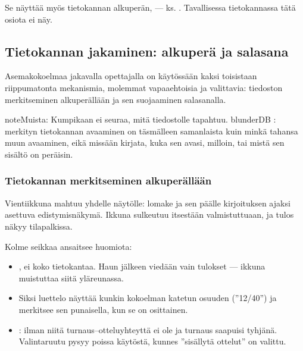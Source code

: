 \documentclass[letterpaper,10pt,finnish]{sphinxmanual}
\begin{document}
\sphinxAtStartPar
Se näyttää myös tietokannan alkuperän,  — ks. {\hyperref[\detokenize{manuel:diffusion-controlee}]{}}. Tavallisessa tietokannassa tätä osiota ei näy.


\subsection{Tietokannan jakaminen: alkuperä ja salasana}
\label{\detokenize{manuel:diffuser-une-base-origine-et-mot-de-passe}}\label{\detokenize{manuel:diffusion-controlee}}
\sphinxAtStartPar
Asemakokoelmaa jakavalla opettajalla on käytössään kaksi toisistaan riippumatonta mekanismia, molemmat vapaaehtoisia ja  valittavia: tiedoston merkitseminen alkuperällään ja sen suojaaminen salasanalla.

\begin{sphinxadmonition}{note}{Muista:}
\sphinxAtStartPar
Kumpikaan ei seuraa, mitä tiedostolle tapahtuu. blunderDB : merkityn tietokannan avaaminen on täsmälleen samanlaista kuin minkä tahansa muun avaaminen, eikä missään kirjata, kuka sen avasi, milloin, tai mistä sen sisältö on peräisin.
\end{sphinxadmonition}


\subsubsection{Tietokannan merkitseminen alkuperällään}
\label{\detokenize{manuel:marquer-une-base-de-son-origine}}
\sphinxAtStartPar
Vienti\sphinxhyphen{}ikkuna mahtuu yhdelle näytölle: lomake ja sen päälle kirjoituksen ajaksi asettuva edistymisnäkymä. Ikkuna sulkeutuu itsestään valmistuttuaan, ja tulos näkyy tilapalkissa.

\sphinxAtStartPar
Kolme seikkaa ansaitsee huomiota:
\begin{itemize}
\item {} 
\sphinxAtStartPar
{}, ei koko tietokantaa. Haun jälkeen viedään vain tulokset — ikkuna muistuttaa siitä yläreunassa.

\item {} 
\sphinxAtStartPar
{} Siksi luettelo näyttää kunkin kokoelman katetun osuuden (”12/40”) ja merkitsee sen punaisella, kun se on osittainen.

\item {} 
\sphinxAtStartPar
{}: ilman niitä turnaus–ottelu\sphinxhyphen{}yhteyttä ei ole ja turnaus saapuisi tyhjänä. Valintaruutu pysyy poissa käytöstä, kunnes ”sisällytä ottelut” on valittu.

\end{itemize}
\end{document}
